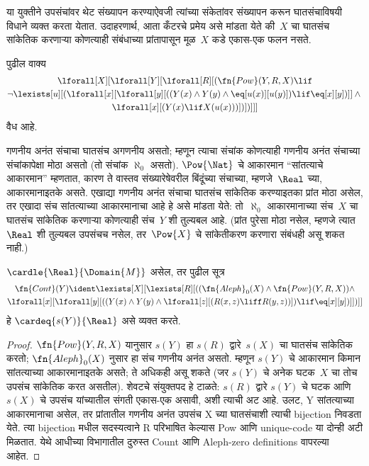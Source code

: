 \begin{explain}
या युक्तीने उपसंचांवर थेट संख्यापन करण्याऐवजी
त्यांच्या संकेतांवर संख्यापन करून घातसंचाविषयी
विधाने व्यक्त करता येतात. उदाहरणार्थ,
आता कँटरचे प्रमेय असे मांडता येते की~$X$ चा
घातसंच सांकेतिक करणाऱ्या कोणत्याही संबंधाच्या
प्रांतापासून मूळ~$X$ कडे एकास-एक फलन नसते.
\end{explain}

\begin{prop}
पुढील वाक्य
\begin{multline*}
  \lforall[X][\lforall[Y][\lforall[R][(\fn{Pow}(Y, R, X) \lif \\
      \lnot \lexists[u][(\lforall[x][\lforall[y][((Y(x) \land Y(y) \land \eq[u(x)][u(y)]) \lif
            \eq[x][y])]] \land {}\\
        \lforall[x][(Y(x) \lif X(u(x)))])])]]]
\end{multline*}
वैध आहे.
\end{prop}

\begin{explain}
गणनीय अनंत संचाचा घातसंच अगणनीय
असतो; म्हणून त्याचा संचांक कोणत्याही
गणनीय अनंत संचाच्या संचांकापेक्षा
मोठा असतो (तो संचांक $\aleph_0$ असतो).
$\Pow{\Nat}$ चे आकारमान ``सांतत्याचे आकारमान''
म्हणतात, कारण ते वास्तव संख्यारेषेवरील
बिंदूंच्या संचाच्या, म्हणजे~$\Real$ च्या,
आकारमानाइतके असते. एखाद्या
गणनीय अनंत संचाचा घातसंच सांकेतिक
करण्याइतका प्रांत मोठा असेल, तर एखादा
संच सांतत्याच्या आकारमानाचा आहे हे असे
मांडता येते: तो~$\aleph_0$ आकारमानाच्या संच~$X$
चा घातसंच सांकेतिक करणाऱ्या कोणत्याही
संच~$Y$ शी तुल्यबल आहे. (प्रांत पुरेसा मोठा
नसेल, म्हणजे त्यात~$\Real$ शी तुल्यबल
उपसंचच नसेल, तर~$\Pow{X}$ चे सांकेतीकरण
करणारा संबंधही असू शकत नाही.)
\end{explain}

\begin{prop}
$\cardle{\Real}{\Domain{M}}$ असेल, तर पुढील
सूत्र
\begin{multline*}
\fn{Cont}(Y) \ident
\lexists[X][\lexists[R][((\fn{Aleph}_0(X) \land
      \fn{Pow}(Y, R, X)) \land \\
      \lforall[x][\lforall[y][((Y(x) \land {}
      Y(y) \land \lforall[z][(R(x,z) \liff R(y,z))]) \lif \eq[x][y])]])]]
\end{multline*}
हे $\cardeq{s(Y)}{\Real}$ असे व्यक्त करते.
\end{prop}

\begin{proof}
  $\fn{Pow}(Y, R, X)$ यानुसार $s(Y)$ हा $s(R)$
  द्वारे~$s(X)$ चा घातसंच सांकेतिक करतो;
  $\fn{Aleph}_0(X)$ नुसार हा संच गणनीय अनंत असतो.
  म्हणून $s(Y)$ चे आकारमान किमान सांतत्याच्या
  आकारमानाइतके असते; ते अधिकही असू शकते
  (जर $s(Y)$ चे अनेक घटक~$X$ चा तोच उपसंच
  सांकेतिक करत असतील). शेवटचे संयुक्तपद
  हे टाळते: $s(R)$ द्वारे $s(Y)$ चे घटक आणि
  $s(X)$ चे उपसंच यांच्यातील संगती
  एकास-एक असावी, अशी त्याची अट आहे.
  उलट, Y सांतत्याच्या आकारमानाचा असेल, तर प्रांतातील
  गणनीय अनंत उपसंच X च्या घातसंचाशी त्याची bijection निवडता
  येते. त्या bijection मधील सदस्यत्वाने R परिभाषित केल्यास
  Pow आणि unique-code या दोन्ही अटी मिळतात. येथे आधीच्या
  विभागातील दुरुस्त Count आणि Aleph-zero definitions वापरल्या आहेत.
\end{proof}

